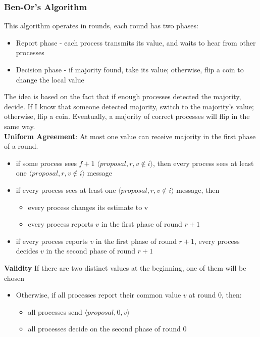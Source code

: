 \documentclass[a4paper,11pt,hidelinks]{article}
\begin{document}
\subsubsection{Ben-Or's Algorithm}

This algorithm operates in rounds, each round has two phases:
\begin{itemize}
    \item Report phase - each process transmits its value, and waits to hear from other processes
    \item Decision phase - if majority found, take its value; otherwise, flip a coin to change the local value
\end{itemize}

The idea is based on the fact that if enough processes detected the majority, decide. If I know that someone detected majority, switch to the majority’s value; otherwise, flip a coin. Eventually, a majority of correct processes will flip in the same way.
\medskip\\
\noindent \textbf{Uniform Agreement}: At most one value can receive majority in the first phase of a round.
\begin{itemize}
    \item if some process sees $f + 1$ $\langle proposal, r, v \notin i \rangle$, then every process sees at least one $\langle proposal, r, v \notin i\rangle$ message
    \item if every process sees at least one $\langle proposal, r, v \notin i\rangle$ message, then \begin{itemize}
              \item every process changes its estimate to v
              \item every process reports $v$ in the first phase of round $r + 1$
          \end{itemize}
    \item if every process reports $v$ in the first phase of round $r + 1$, every process decides $v$ in the second phase of round $r + 1$
\end{itemize}
\textbf{Validity} If there are two distinct values at the beginning, one of them will be chosen
\begin{itemize}
    \item Otherwise, if all processes report their common value $v$ at round 0, then: \begin{itemize}
              \item all processes send $\langle proposal, 0, v\rangle $
              \item all processes decide on the second phase of round 0
          \end{itemize}

\end{itemize}
\end{document}
